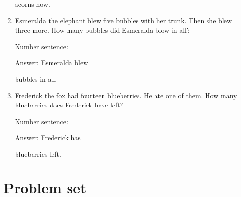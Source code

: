 \documentclass{tufte-book}
\begin{document}
\begin{enumerate}
  acorns now.
\item
  Esmeralda the elephant blew five bubbles with her trunk. Then she blew
  three more. How many bubbles did Esmeralda blow in all?\medskip\par
  Number sentence:
  \dotfill\medskip\par
  Answer: Esmeralda blew
  \dotfill\medskip\par\mbox{}\dotfill\medskip\par\mbox{}\dotfill\bigskip
  bubbles in all.
\item
  Frederick the fox had fourteen blueberries. He ate one of them. How
  many blueberries does Frederick have left?\medskip\par
  Number sentence:
  \dotfill\medskip\par
  Answer: Frederick has
  \dotfill\medskip\par\mbox{}\dotfill\medskip\par\mbox{}\dotfill\bigskip
  blueberries left.
\end{enumerate}



\clearpage\section{Problem set }
\end{document}
